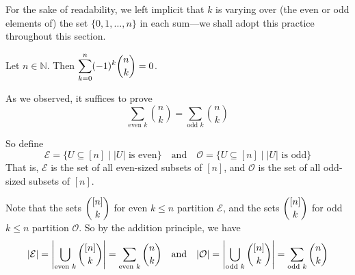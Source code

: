 For the sake of readability, we left implicit that $k$ is varying over (the even or odd elements of) the set $\{ 0, 1, \dots, n \}$ in each sum---we shall adopt this practice throughout this section.

\begin{proposition}
\label{propAlternatingSumOfBinomialCoefficientsByBijection}
Let $n \in \mathbb{N}$. Then $\displaystyle \sum_{k=0}^n (-1)^k \dbinom{n}{k} = 0$.
\end{proposition}

\begin{cproof}
As we observed, it suffices to prove
\[ \sum_{\text{even } k} \binom{n}{k} = \sum_{\text{odd } k} \binom{n}{k} \]

So define
\[ \mathcal{E} = \{ U \subseteq [n] \mid |U| \text{ is even} \} \quad \text{and} \quad \mathcal{O} = \{ U \subseteq [n] \mid |U| \text{ is odd} \} \]
That is, $\mathcal{E}$ is the set of all even-sized subsets of $[n]$, and $\mathcal{O}$ is the set of all odd-sized subsets of $[n]$.

Note that the sets $\dbinom{[n]}{k}$ for even $k \le n$ partition $\mathcal{E}$, and the sets $\dbinom{[n]}{k}$ for odd $k \le n$ partition $\mathcal{O}$. So by the addition principle, we have
\[ |\mathcal{E}| = \left| \bigcup_{\text{even } k} \dbinom{[n]}{k} \right| = \sum_{\text{even } k} \dbinom{n}{k} \quad \text{and} \quad |\mathcal{O}| = \left| \bigcup_{\text{odd } k} \dbinom{[n]}{k} \right| = \sum_{\text{odd } k} \dbinom{n}{k} \]


\end{cproof}
